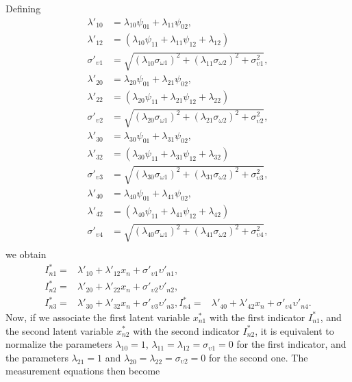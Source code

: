 \documentclass[12pt,a4paper]{article}
\begin{document}
Defining
\[
\begin{aligned}
  \lambda'_{10} &= \lambda_{10}  \psi_{01}+ \lambda_{11} \psi_{02}, \\
  \lambda'_{12} &= (\lambda_{10}\psi_{11}+ \lambda_{11} \psi_{12} +\lambda_{12}) \\
  \sigma'_{\upsilon 1} &= \sqrt{(\lambda_{10}\sigma_{\omega 1})^ 2 + (\lambda_{11} \sigma_{\omega 2})^2 + \sigma^2_{\upsilon 1}}, \\
  \lambda'_{20} &= \lambda_{20}  \psi_{01}+ \lambda_{21} \psi_{02}, \\
  \lambda'_{22} &= (\lambda_{20}\psi_{11}+ \lambda_{21} \psi_{12} +\lambda_{22}) \\
  \sigma'_{\upsilon 2} &= \sqrt{(\lambda_{20}\sigma_{\omega 1})^ 2 + (\lambda_{21} \sigma_{\omega 2})^2 + \sigma^2_{\upsilon 2}}, \\
  \lambda'_{30} &= \lambda_{30}  \psi_{01}+ \lambda_{31} \psi_{02}, \\
  \lambda'_{32} &= (\lambda_{30}\psi_{11}+ \lambda_{31} \psi_{12} +\lambda_{32}) \\
  \sigma'_{\upsilon 3} &= \sqrt{(\lambda_{30}\sigma_{\omega 1})^ 2 + (\lambda_{31} \sigma_{\omega 2})^2 + \sigma^2_{\upsilon 3}}, \\
  \lambda'_{40} &= \lambda_{40}  \psi_{01}+ \lambda_{41} \psi_{02}, \\
  \lambda'_{42} &= (\lambda_{40}\psi_{11}+ \lambda_{41} \psi_{12} +\lambda_{42}) \\
  \sigma'_{\upsilon 4} &= \sqrt{(\lambda_{40}\sigma_{\omega 1})^ 2 + (\lambda_{41} \sigma_{\omega 2})^2 + \sigma^2_{\upsilon 4}}, \\
\end{aligned}
\]
we obtain
\[
\begin{aligned}
  I^*_{n1} =&  \lambda'_{10}+ \lambda'_{12} x_{n} + \sigma'_{\upsilon 1} \upsilon'_{n1},  \\
  I^*_{n2} =&  \lambda'_{20}+ \lambda'_{22} x_{n} + \sigma'_{\upsilon 2} \upsilon'_{n2},  \\
  I^*_{n3} =&  \lambda'_{30}+ \lambda'_{32} x_{n} + \sigma'_{\upsilon 3} \upsilon'_{n3},
  I^*_{n4} =&  \lambda'_{40}+ \lambda'_{42} x_{n} + \sigma'_{\upsilon 4} \upsilon'_{n4}.
\end{aligned}
\]
Now, if we associate the first latent variable $x^*_{n1}$ with the first indicator $I^*_{n1}$,
and the second latent variable $x^*_{n2}$ with the second indicator $I^*_{n2}$, it is equivalent to normalize the parameters $\lambda_{10}=1$, $\lambda_{11}=\lambda_{12}=\sigma_{\upsilon 1}=0$ for the first indicator, and the parameters $\lambda_{21}=1$ and $\lambda_{20}=\lambda_{22}=\sigma_{\upsilon 2}=0$ for the second one. The measurement equations then become
\end{document}
